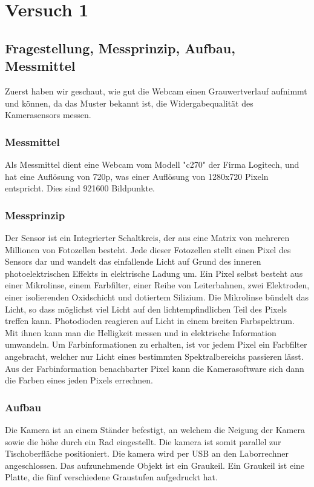 \documentclass[TGAI_Laborbericht.tex]{subfiles}
\begin{document}
\chapter{Versuch 1}
\label{chap:VERSUCH_1}


\section{Fragestellung, Messprinzip, Aufbau, Messmittel}
\label{chap:VERSUCH_1_FRAGESTELLUNG}
Zuerst haben wir geschaut, wie gut die Webcam einen Grauwertverlauf aufnimmt und können, da das Muster bekannt ist, die Widergabequalität des Kamerasensors messen. 

\subsection{Messmittel}

Als Messmittel dient eine Webcam vom Modell "c270" der Firma Logitech, und hat eine Auflösung von 720p, was einer Auflösung von 1280x720 Pixeln entspricht. Dies sind 921600 Bildpunkte.

\subsection{Messprinzip}

Der Sensor ist ein Integrierter Schaltkreis, der aus eine Matrix von mehreren Millionen von Fotozellen besteht. Jede dieser Fotozellen stellt einen Pixel des Sensors dar und wandelt das einfallende Licht auf Grund des inneren photoelektrischen Effekts in elektrische Ladung um.
Ein Pixel selbst besteht aus einer Mikrolinse, einem Farbfilter, einer Reihe von Leiterbahnen, zwei Elektroden, einer isolierenden Oxidschicht und dotiertem Silizium.
Die Mikrolinse bündelt das Licht, so dass möglichst viel Licht auf den lichtempfindlichen Teil des Pixels treffen kann.
Photodioden reagieren auf Licht in einem breiten Farbspektrum. Mit ihnen kann man die Helligkeit messen und in elektrische Information umwandeln. Um Farbinformationen zu erhalten, ist vor jedem Pixel ein Farbfilter angebracht, welcher nur Licht eines bestimmten Spektralbereichs passieren lässt. Aus der Farbinformation benachbarter Pixel kann die Kamerasoftware sich dann die Farben eines jeden Pixels errechnen.

\subsection{Aufbau}
Die Kamera ist an einem Ständer befestigt, an welchem die Neigung der Kamera sowie die höhe durch ein Rad eingestellt. Die kamera ist somit parallel zur Tischoberfläche positioniert. Die kamera wird per USB an den Laborrechner angeschlossen. Das aufzunehmende Objekt ist ein Graukeil. Ein Graukeil ist eine Platte, die fünf verschiedene Graustufen aufgedruckt hat.
\end{document}

